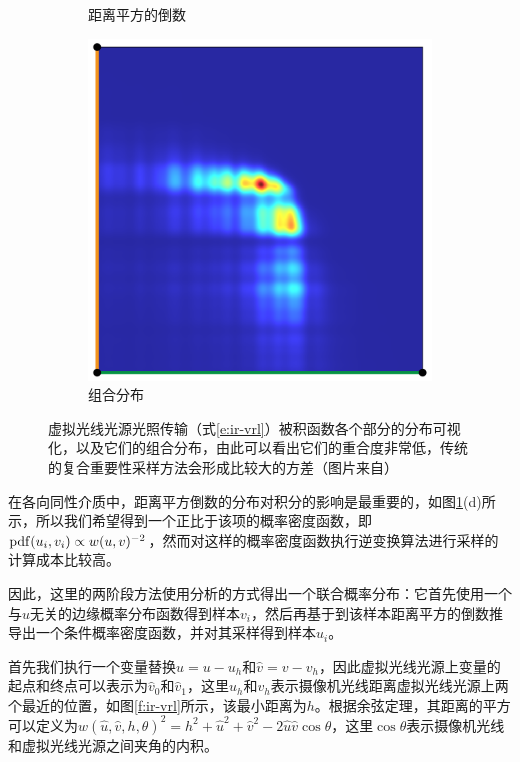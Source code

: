 \begin{figure}
\begin{fullwidth}
\begin{subfigure}[b]{0.19\thewidth}
		\caption{距离平方的倒数}
	\end{subfigure}
	\begin{subfigure}[b]{0.19\thewidth}
		\includegraphics[width=1.0\textwidth]{figures/ir/vrl-all}
		\caption{组合分布}
	\end{subfigure}
	\caption{虚拟光线光源光照传输（式\ref{e:ir-vrl}）被积函数各个部分的分布可视化，以及它们的组合分布，由此可以看出它们的重合度非常低，传统的复合重要性采样方法会形成比较大的方差（图片来自\cite{a:VirtualRayLightsforRenderingSceneswithParticipatingMedia}）}
	\label{f:ir-vrl-all}
\end{fullwidth}
\end{figure}

在各向同性介质中，距离平方倒数的分布对积分的影响是最重要的，如图\ref{f:ir-vrl-all}(d)所示，所以我们希望得到一个正比于该项的概率密度函数，即${\rm pdf}(u_i,v_i)\propto w(u,v)^{-2}$，然而对这样的概率密度函数执行逆变换算法进行采样的计算成本比较高。

因此，这里的两阶段方法使用分析的方式得出一个联合概率分布：它首先使用一个与$u$无关的边缘概率分布函数得到样本$v_i$，然后再基于到该样本距离平方的倒数推导出一个条件概率密度函数，并对其采样得到样本$u_i$。

首先我们执行一个变量替换$\hat{u}=u-u_h$和$\hat{v}=v-v_h$，因此虚拟光线光源上变量的起点和终点可以表示为$\hat{v}_0$和$\hat{v}_1$，这里$u_h$和$v_h$表示摄像机光线距离虚拟光线光源上两个最近的位置，如图\ref{f:ir-vrl}所示，该最小距离为$h$。根据余弦定理，其距离的平方可以定义为$w(\hat{u},\hat{v},h,\theta)^{2}=h^{2}+\hat{u}^{2}+\hat{v}^{2}-2\hat{u}\hat{v}\cos\theta$，这里$\cos\theta$表示摄像机光线和虚拟光线光源之间夹角的内积。

